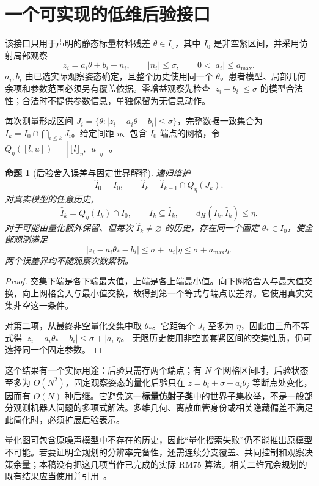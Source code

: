 \documentclass[11pt,a4paper]{article}
\theoremstyle{cn}
\newtheorem{proposition}[theorem]{命题}
\begin{document}
\section{一个可实现的低维后验接口}
\label{app:interval}

该接口只用于声明的静态标量材料残差
\(\theta\in I_0\)，其中 \(I_0\) 是非空紧区间，并采用仿射局部观察
\[
z_i=a_i\theta+b_i+n_i,\qquad |n_i|\le\sigma,\qquad 0<|a_i|\le a_{\max}.
\]
\(a_i,b_i\) 由已选实际观察姿态确定，且整个历史使用同一个 \(\theta\)。患者模型、局部几何余项和参数范围必须另有覆盖依据。零增益观察先检查 \(|z_i-b_i|\le\sigma\) 的模型合法性；合法时不提供参数信息，单独保留为无信息动作。

每次测量形成区间 \(J_i=\{\theta:|z_i-a_i\theta-b_i|\le\sigma\}\)，完整数据一致集合为
\(I_k=I_0\cap\bigcap_{i\le k}J_i\)。给定间距 \(\eta\)、包含 \(I_0\) 端点的网格，令
\(Q_\eta([l,u])=[\lfloor l\rfloor_\eta,\lceil u\rceil_\eta]\)。

\begin{proposition}[后验舍入误差与固定世界解释]
\label{prop:interval}
递归维护
\[
\widehat I_0=I_0,\qquad
\widehat I_k=\widehat I_{k-1}\cap Q_\eta(J_k).
\]
对真实模型的任意历史，
\[
\widehat I_k=Q_\eta(I_k)\cap I_0,\qquad
I_k\subseteq\widehat I_k,\qquad d_H(I_k,\widehat I_k)\le\eta.
\]
对于可能由量化额外保留、但每次 \(\widehat I_k\ne\varnothing\) 的历史，存在同一个固定 \(\theta_*\in I_0\)，使全部观测满足
\[
|z_i-a_i\theta_*-b_i|\le\sigma+|a_i|\eta
\le\sigma+a_{\max}\eta.
\]
两个误差界均不随观察次数累积。
\end{proposition}

\begin{proof}
交集下端是各下端最大值，上端是各上端最小值。向下网格舍入与最大值交换，向上网格舍入与最小值交换，故得到第一个等式与端点误差界。它使用真实交集非空这一条件。

对第二项，从最终非空量化交集中取 \(\theta_*\)。它距每个 \(J_i\) 至多为 \(\eta\)，因此由三角不等式得
\(|z_i-a_i\theta_*-b_i|\le\sigma+|a_i|\eta\)。
无限历史使用非空嵌套紧区间的交集性质，仍可选择同一个固定参数。
\end{proof}

这个结果有一个实际用途：后验只需存两个端点；有 \(N\) 个网格区间时，后验状态至多为 \(O(N^2)\)，固定观察姿态的量化后验只在
\(z=b_i\pm\sigma+a_i\theta_j\) 等断点处变化，因而有 \(O(N)\) 种后继。它避免这一\textbf{标量仿射子类}中的世界子集枚举，不是一般部分观测机器人问题的多项式解法。多维几何、离散血管身份或相关隐藏偏差不满足此简化时，必须扩展后验表示。

量化图可包含原噪声模型中不存在的历史，因此“量化搜索失败”仍不能推出原模型不可能。若要证明全规划的分辨率完备性，还需连续分支覆盖、共同控制和观察决策余量；本稿没有把这几项当作已完成的实际 RM75 算法。相关二维冗余规划的既有结果应当使用并引用~\cite{qiu,hauser}。
\end{document}
